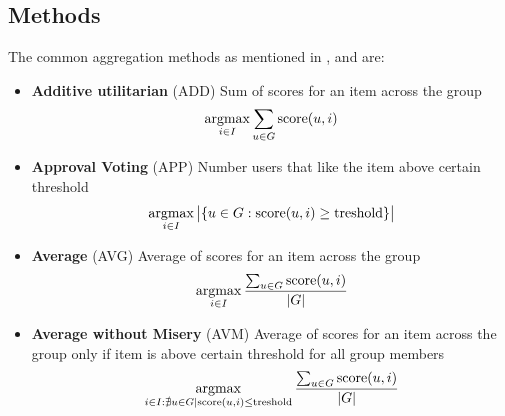 \subsection{Methods}
The common aggregation methods as mentioned in \cite{grouprecommendersystems_felfernig2018group}, \cite{masthoff_2011_group_rec_systems} and \cite{masthoff_2004_group_modeling} are:
\begin{itemize}
    \item \textbf{Additive utilitarian} (ADD)\newline
        Sum of scores for an item across the group
        \begin{equation}
            \operatorname*{argmax}_{i \in I}{\sum_{u \in G}{\textrm{score}(u,i)}}
        \end{equation}
    
    \item \textbf{Approval Voting} (APP)\newline
        Number users that like the item above certain threshold
        \begin{equation}
            \operatorname*{argmax}_{i \in I}{
                \big\lvert{\left\{
                    u \in G : \textrm{score}(u,i) \geq \textrm{treshold}
                \right\}}\big\rvert
            }
        \end{equation}
    
    \item \textbf{Average} (AVG)\newline
        Average of scores for an item across the group
        \begin{equation}
            \operatorname*{argmax}_{i \in I}{\dfrac{\sum_{u \in G}{\textrm{score}(u,i)}}{\left\lvert{G}\right\rvert}}
        \end{equation}
    
    \item \textbf{Average without Misery} (AVM)\newline
        Average of scores for an item across the group only if item is above certain threshold for all group members
        \begin{equation}
            \operatorname*{argmax}_{ i \in I : \nexists u \in G | \textrm{score}(u,i) \leq \textrm{treshold}}{
                \dfrac{\sum_{u \in G}{\textrm{score}(u,i)}}{\left\lvert{G}\right\rvert}
            }
        \end{equation}
        

\end{itemize}
